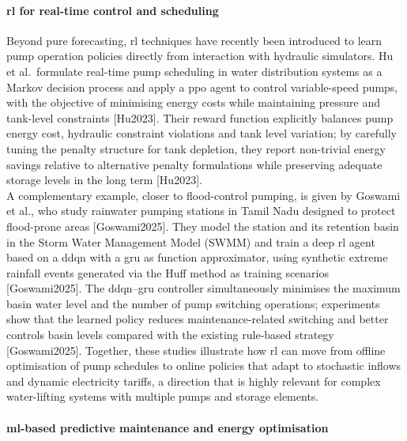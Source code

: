 \paragraph{\acrlong{rl} for real-time control and scheduling}

Beyond pure forecasting, \acrshort{rl} techniques have recently been introduced to learn pump operation policies directly from interaction with hydraulic simulators. Hu et al.\ formulate real-time pump scheduling in water distribution systems as a Markov decision process and apply a \acrfull{ppo} agent to control variable-speed pumps, with the objective of minimising energy costs while maintaining pressure and tank-level constraints [Hu2023]. Their reward function explicitly balances pump energy cost, hydraulic constraint violations and tank level variation; by carefully tuning the penalty structure for tank depletion, they report non-trivial energy savings relative to alternative penalty formulations while preserving adequate storage levels in the long term [Hu2023]. \\

A complementary example, closer to flood-control pumping, is given by Goswami et al., who study rainwater pumping stations in Tamil Nadu designed to protect flood-prone areas [Goswami2025]. They model the station and its retention basin in the Storm Water Management Model (SWMM) and train a deep \acrshort{rl} agent based on a \acrfull{ddqn} with a \acrfull{gru} as function approximator, using synthetic extreme rainfall events generated via the Huff method as training scenarios [Goswami2025]. The \acrshort{ddqn}–\acrshort{gru} controller simultaneously minimises the maximum basin water level and the number of pump switching operations; experiments show that the learned policy reduces maintenance-related switching and better controls basin levels compared with the existing rule-based strategy [Goswami2025]. Together, these studies illustrate how \acrshort{rl} can move from offline optimisation of pump schedules to online policies that adapt to stochastic inflows and dynamic electricity tariffs, a direction that is highly relevant for complex water-lifting systems with multiple pumps and storage elements.

\paragraph{\acrlong{ml}-based predictive maintenance and energy optimisation}

